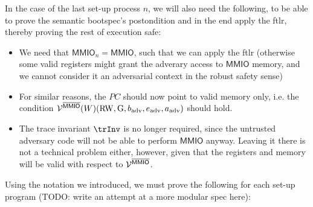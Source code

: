 \documentclass{article}
\newcommand{\X}[1]{\ensuremath{\mathrm{#1}}}
\newcommand{\Sf}[1]{\ensuremath{\mathsf{#1}}}
\newcommand{\MMIO}{\Sf{MMIO}\xspace}
\begin{document}
In the case of the last set-up process $n$, we will also need the following, to be able to prove the semantic bootspec's postondition and in the end apply the ftlr, thereby proving the rest of execution safe:
\begin{itemize}
\item We need that $\MMIO_n = \MMIO$, such that we can apply the ftlr (otherwise some valid registers might grant the adverary access to \MMIO memory, and we cannot consider it an adversarial context in the robust safety sense)
\item For similar reasons, the $PC$ should now point to valid memory only, i.e. the condition $\VR^{\notMMIO} (W)(\X{RW}, \X{G}, b_{\X{adv}}, e_{\X{adv}}, a_{\X{adv}})$ should hold.
\item The trace invariant $\trInv$ is no longer required, since the untrusted adversary code will not be able to perform \MMIO anyway. Leaving it there is not a technical problem either, however, given that the registers and memory will be valid with respect to $\VR^{\notMMIO}$.
\end{itemize}

Using the notation we introduced, we must prove the following for each set-up program (TODO: write an attempt at a more modular spec here):
\end{document}
